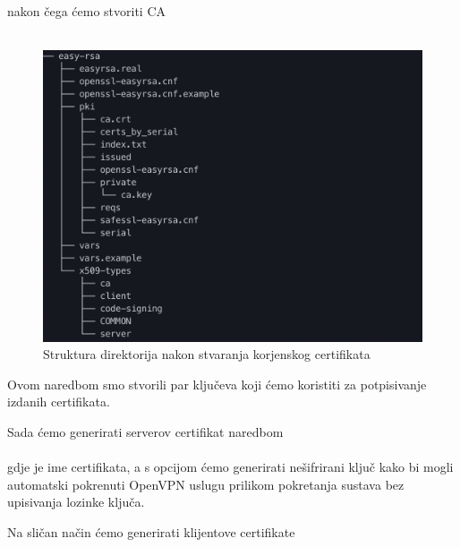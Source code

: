         \noindent
        nakon čega ćemo stvoriti CA  \\

        \noindent
         \\
        
        \begin{figure}[H]
            \centering
            \includegraphics[scale=0.5]{slike/afterBuildCa}
            \caption{Struktura direktorija nakon stvaranja korjenskog
            certifikata}
        \end{figure}

        \noindent
        Ovom naredbom smo stvorili par ključeva koji ćemo koristiti za
        potpisivanje izdanih certifikata. 

        \noindent
        Sada ćemo generirati serverov certifikat naredbom \\

        \noindent
         \\

        \noindent
        gdje je  ime certifikata, a s  opcijom ćemo
        generirati nešifrirani ključ kako bi mogli automatski pokrenuti OpenVPN
        uslugu prilikom pokretanja sustava bez upisivanja lozinke ključa.

        Na sličan način ćemo generirati klijentove certifikate \\

        \noindent
         \\
        
